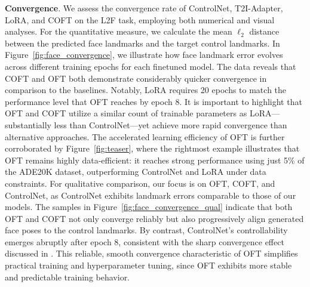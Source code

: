 \textbf{Convergence}. We assess the convergence rate of ControlNet, T2I-Adapter, LoRA, and COFT on the L2F task, employing both numerical and visual analyses. For the quantitative measure, we calculate the mean $\ell_2$ distance between the predicted face landmarks and the target control landmarks. In Figure~\ref{fig:face_convergence}, we illustrate how face landmark error evolves across different training epochs for each finetuned model. The data reveals that COFT and OFT both demonstrate considerably quicker convergence in comparison to the baselines. Notably, LoRA requires 20 epochs to match the performance level that OFT reaches by epoch 8. It is important to highlight that OFT and COFT utilize a similar count of trainable parameters as LoRA—substantially less than ControlNet—yet achieve more rapid convergence than alternative approaches. The accelerated learning efficiency of OFT is further corroborated by Figure~\ref{fig:teaser}, where the rightmost example illustrates that OFT remains highly data-efficient: it reaches strong performance using just 5\% of the ADE20K dataset, outperforming ControlNet and LoRA under data constraints. For qualitative comparison, our focus is on OFT, COFT, and ControlNet, as ControlNet exhibits landmark errors comparable to those of our models. The samples in Figure~\ref{fig:face_convergence_qual} indicate that both OFT and COFT not only converge reliably but also progressively align generated face poses to the control landmarks. By contrast, ControlNet’s controllability emerges abruptly after epoch 8, consistent with the sharp convergence effect discussed in \cite{zhang2023adding}. This reliable, smooth convergence characteristic of OFT simplifies practical training and hyperparameter tuning, since OFT exhibits more stable and predictable training behavior.

